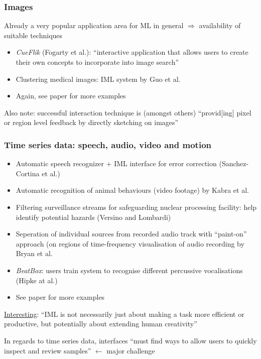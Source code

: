 \documentclass[12pt,a4paper]{article}
\begin{document}
\subsubsection{Images}
\begin{description}
\item Already a very popular application area for ML in general $\Rightarrow$ availability of suitable techniques 
\end{description}
\begin{itemize}
\item \textit{CueFlik} (Fogarty et al.): ``interactive application that allows users to create their own concepts to incorporate into image search''
\item Clustering medical images: IML system by Guo et al.
\item Again, see paper for more examples
\end{itemize}
\begin{description}
\item Also note: successful interaction technique is (amongst others) ``provid[ing] pixel
or region level feedback by directly sketching on images''
\end{description}
\subsubsection{Time series data: speech, audio, video and motion}
\begin{itemize}
\item Automatic speech recognizer + IML interface for error correction (Sanchez-Cortina et al.)
\item Automatic recognition of animal behaviours (video footage) by Kabra et al.
\item Filtering surveillance streams for safeguarding nuclear processing facility: help identify potential hazards (Versino and Lombardi)
\item Seperation of individual sources from recorded audio track with ``paint-on'' approach (on regions of time-frequency visualisation of audio recording by Bryan et al.
\item \textit{BeatBox}: users train system to recognise different percussive vocalisations (Hipke at al.)
\item See paper for more examples
\end{itemize}
\begin{description}
\item \underline{Interesting}: ``IML is not necessarily just about making a task more efficient or
productive, but potentially about extending human creativity''
\item In regards to time series data, interfaces ``must find ways to allow users to quickly inspect and review samples'' $\leftarrow$ major challenge
\end{description}
\end{document}
